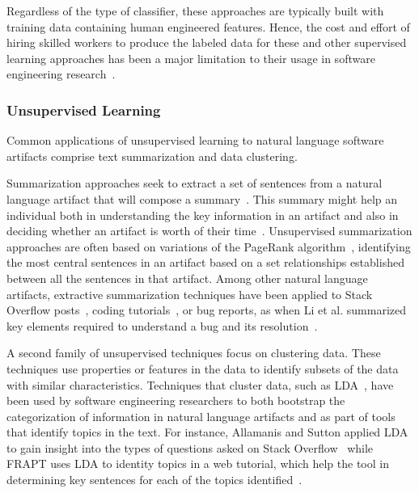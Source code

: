 Regardless of the type of classifier, these approaches are typically built 
with training data containing human engineered features.
Hence, the cost and effort of hiring skilled workers to produce 
the labeled data for these and other supervised learning approaches
has been a major limitation to their usage in software engineering research~\cite{Arpteg2018, ferreira2021}.




\subsubsection{Unsupervised Learning}
\label{cp2:unsupervised}



Common applications of unsupervised learning 
to natural language software artifacts 
comprise text summarization and data clustering.


Summarization approaches seek to
extract a set of sentences 
from a natural language artifact that will compose a summary~\cite{Goldsteinet1999}.
This summary might help an individual both in understanding the key information in an 
artifact and also in deciding whether an artifact is worth of their time~\cite{Lotufo2012}.
Unsupervised summarization approaches are often based on 
variations of the PageRank algorithm~\cite{Page1999}, identifying
the most central sentences in an artifact based on a set relationships
established between all the sentences in that artifact.
Among other natural language artifacts,
extractive summarization techniques
have been applied to Stack Overflow posts~\cite{Ponzanelli2015},
coding tutorials~\cite{Li2018},
or bug reports, as
when Li et al. summarized 
key elements required to understand a bug and its resolution~\cite{li2018deep}.




A second family of unsupervised techniques focus on clustering data.
These techniques use properties or features in the data to 
identify 
subsets of the data with similar characteristics. 
Techniques that cluster data, such as \acf{LDA}~\cite{blei2003latent},
have been used by software engineering researchers to both 
bootstrap the categorization of information in 
natural language artifacts and as part of tools that identify topics in the text. 
For instance, Allamanis and Sutton
applied \acs{LDA}
to gain insight into the types of questions 
asked on Stack Overflow~\cite{Allamanis2013}
while FRAPT
uses \acs{LDA} to identity topics in a web tutorial,
which help the tool in determining 
key sentences for each of the topics identified~\cite{Jiang2017}.



